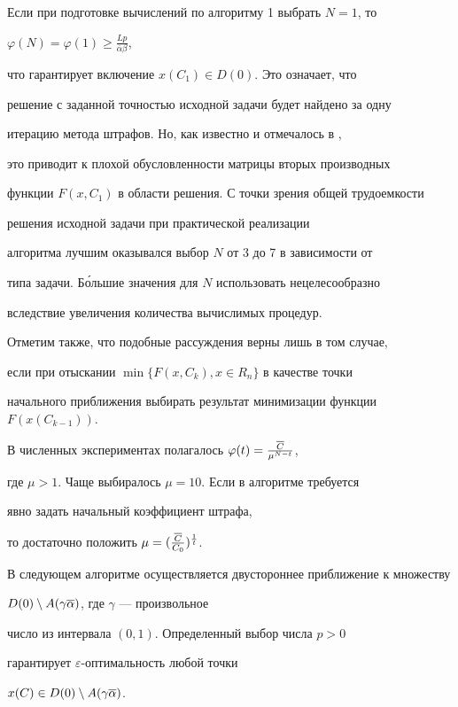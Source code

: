 Если при подготовке вычислений по алгоритму 1 выбрать $N=1$, то


$\varphi(N)=\varphi(1)\geq\frac{Lp}{\overline\alpha\beta}$,


что гарантирует включение $x(C_1)\in D(0)$. Это означает, что


решение с заданной точностью исходной задачи будет найдено за одну


итерацию метода штрафов. Но, как известно и отмечалось в \cite{Zab},


это приводит к плохой обусловленности матрицы вторых производных 


функции $F(x,C_1)$ в области решения. С точки зрения общей трудоемкости


решения исходной задачи при практической реализации 


алгоритма лучшим оказывался выбор $N$ от 3 до 7 в зависимости от 


типа задачи. Б\'ольшие значения для $N$ использовать нецелесообразно


вследствие увеличения количества вычислимых процедур.


Отметим также, что подобные рассуждения верны лишь в том случае, 


если при отыскании $\min\{F(x,C_k), x\in R_n\}$ в качестве точки 


начального приближения выбирать результат минимизации функции $F(x(C_{k-1}))$.





В численных экспериментах полагалось $\varphi(t)=\frac{\overline C}{\mu^{N-t}}$, 


где $\mu >1$. Чаще выбиралось $\mu = 10$. Если в алгоритме требуется 


явно задать начальный коэффициент штрафа,


то достаточно положить $\mu=(\frac{\overline C}{C_0})^{\frac{1}{t}}$.





В следующем алгоритме осуществляется двустороннее приближение к множеству\linebreak


$D(0)\setminus A(\gamma\overline\alpha)$, где $\gamma$ --- произвольное 


число из интервала $(0,1)$. Определенный выбор числа $p>0$ 


гарантирует $\varepsilon$-оптимальность любой точки


$x(C)\in D(0)\setminus A(\gamma\overline\alpha)$.





